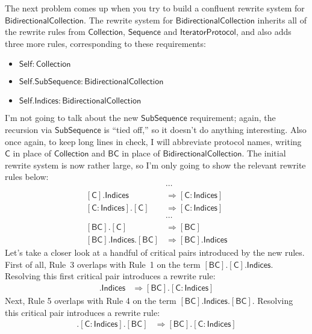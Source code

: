 \documentclass[headsepline,bibliography=totoc]{scrreport}
\newcommand{\namesym}[1]{\mathsf{#1}}
\newcommand{\genericparam}[1]{\bm{\mathsf{#1}}}
\newcommand{\proto}[1]{\bm{\mathsf{#1}}}
\newcommand{\protosym}[1]{[\proto{#1}]}
\newcommand{\assocsym}[2]{[\proto{#1}\colon\namesym{#2}]}
\theoremstyle{definition}
\theoremstyle{definition}
\theoremstyle{definition}
\begin{document}
The next problem comes up when you try to build a confluent rewrite system for $\proto{BidirectionalCollection}$. The rewrite system for $\proto{BidirectionalCollection}$ inherits all of the rewrite rules from $\proto{Collection}$, $\proto{Sequence}$ and $\proto{IteratorProtocol}$, and also adds three more rules, corresponding to these requirements:
\begin{itemize}
\item $\genericparam{Self}\colon\proto{Collection}$
\item $\genericparam{Self}.\namesym{SubSequence}\colon\proto{BidirectionalCollection}$
\item $\genericparam{Self}.\namesym{Indices}\colon\proto{BidirectionalCollection}$
\end{itemize}
I'm not going to talk about the new $\namesym{SubSequence}$ requirement; again, the recursion via $\namesym{SubSequence}$ is ``tied off,'' so it doesn't do anything interesting. Also once again, to keep long lines in check, I will abbreviate protocol names, writing $\proto{C}$ in place of $\proto{Collection}$ and $\proto{BC}$ in place of $\proto{BidirectionalCollection}$. The initial rewrite system is now rather large, so I'm only going to show the relevant rewrite rules below:
\begin{align}
&\cdots\nonumber\\
\protosym{C}.\namesym{Indices}&\Rightarrow\assocsym{C}{Indices}\tag{1}\\
\assocsym{C}{Indices}.\protosym{C}&\Rightarrow\assocsym{C}{Indices}\tag{2}\\
&\cdots\nonumber\\
\protosym{BC}.\protosym{C}&\Rightarrow\protosym{BC}\tag{3}\\
\protosym{BC}.\namesym{Indices}.\protosym{BC}&\Rightarrow\protosym{BC}.\namesym{Indices}\tag{4}
\end{align}
Let's take a closer look at a handful of critical pairs introduced by the new rules. First of all, Rule~3 overlaps with Rule~1 on the term $\protosym{BC}.\protosym{C}.\namesym{Indices}$. Resolving this first critical pair introduces a rewrite rule:
\begin{align}
\protosym{BC}.\namesym{Indices}&\Rightarrow\protosym{BC}.\assocsym{C}{Indices}\tag{5}
\end{align}
Next, Rule 5 overlaps with Rule 4 on the term $\protosym{BC}.\namesym{Indices}.\protosym{BC}$.
Resolving this critical pair introduces a rewrite rule:
\begin{align}
\protosym{BC}.\assocsym{C}{Indices}.\protosym{BC}&\Rightarrow\protosym{BC}.\assocsym{C}{Indices}\tag{6}
\end{align}
\end{document}
